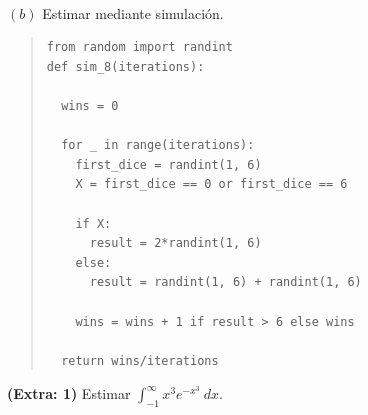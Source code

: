 \documentclass[a4paper, 12pt]{article}
\begin{document}
~ 

$(b)$ Estimar mediante simulación.


\footnotesize
\begin{quote}

\begin{verbatim}
from random import randint
def sim_8(iterations):

  wins = 0

  for _ in range(iterations):
    first_dice = randint(1, 6)
    X = first_dice == 0 or first_dice == 6
  
    if X:
      result = 2*randint(1, 6)
    else:
      result = randint(1, 6) + randint(1, 6)

    wins = wins + 1 if result > 6 else wins

  return wins/iterations
\end{verbatim}

\end{quote}
\normalsize

\pagebreak 

\textbf{(Extra: 1)} Estimar $\int_{-1}^\infty x^3e^{-x^3} ~ dx$.
\end{document}
